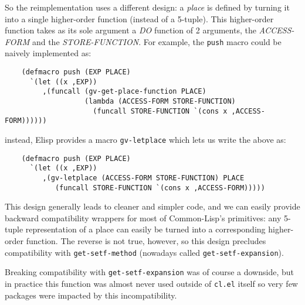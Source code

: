 \documentclass[format=acmsmall, review=false, screen=true]{acmart}
\newcommand \Elisp {Elisp}
\begin{document}
So the reimplementation uses a different design: a \emph{place} is defined
by turning it into a single higher-order function (instead of a 5-tuple).
This higher-order function takes as its sole argument a \textsl{DO} function
of 2 arguments, the \textsl{ACCESS-FORM} and the \textsl{STORE-FUNCTION}.
For example, the \texttt{push} macro could be naively implemented as:
\begin{verbatim}
    (defmacro push (EXP PLACE)
      `(let ((x ,EXP))
         ,(funcall (gv-get-place-function PLACE)
                   (lambda (ACCESS-FORM STORE-FUNCTION)
                     (funcall STORE-FUNCTION `(cons x ,ACCESS-FORM))))))
\end{verbatim}
instead, \Elisp{} provides a macro \texttt{gv-letplace} which lets us
write the above as:
\begin{verbatim}
    (defmacro push (EXP PLACE)
      `(let ((x ,EXP))
         ,(gv-letplace (ACCESS-FORM STORE-FUNCTION) PLACE
            (funcall STORE-FUNCTION `(cons x ,ACCESS-FORM)))))
\end{verbatim}
This design generally leads to cleaner and simpler code, and we can easily
provide backward compatibility wrappers for most of Common-Lisp's
primitives: any 5-tuple representation of a place can easily be turned into
a corresponding higher-order function.  The reverse is not true, however, so
this design precludes compatibility with \texttt{get-setf-method} (nowadays
called \texttt{get-setf-expansion}).

Breaking compatibility with \texttt{get-setf-expansion}
was of course
a downside, but in practice this function was almost never used outside of
\texttt{cl.el} itself so very few packages were impacted by
this incompatibility.
\end{document}
